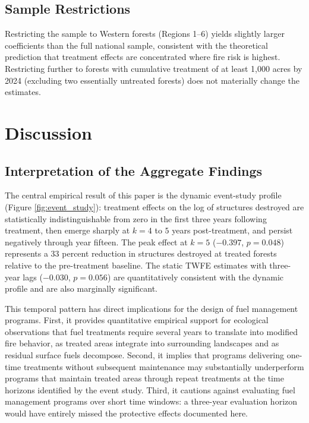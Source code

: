 \documentclass[12pt, letterpaper]{article}
\begin{document}
\subsection{Sample Restrictions}

Restricting the sample to Western forests (Regions 1--6) yields slightly larger coefficients than the full national sample, consistent with the theoretical prediction that treatment effects are concentrated where fire risk is highest. Restricting further to forests with cumulative treatment of at least 1{,}000 acres by 2024 (excluding two essentially untreated forests) does not materially change the estimates.


\section{Discussion}\label{sec:discussion}

\subsection{Interpretation of the Aggregate Findings}

The central empirical result of this paper is the dynamic event-study profile (Figure \ref{fig:event_study}): treatment effects on the log of structures destroyed are statistically indistinguishable from zero in the first three years following treatment, then emerge sharply at $k = 4$ to $5$ years post-treatment, and persist negatively through year fifteen. The peak effect at $k = 5$ ($-0.397$, $p = 0.048$) represents a 33 percent reduction in structures destroyed at treated forests relative to the pre-treatment baseline. The static TWFE estimates with three-year lags ($-0.030$, $p = 0.056$) are quantitatively consistent with the dynamic profile and are also marginally significant.

This temporal pattern has direct implications for the design of fuel management programs. First, it provides quantitative empirical support for ecological observations that fuel treatments require several years to translate into modified fire behavior, as treated areas integrate into surrounding landscapes and as residual surface fuels decompose. Second, it implies that programs delivering one-time treatments without subsequent maintenance may substantially underperform programs that maintain treated areas through repeat treatments at the time horizons identified by the event study. Third, it cautions against evaluating fuel management programs over short time windows: a three-year evaluation horizon would have entirely missed the protective effects documented here.
\end{document}
